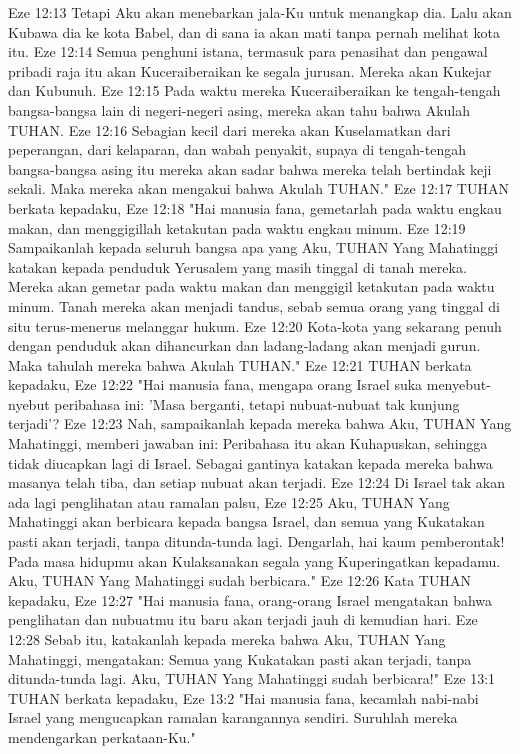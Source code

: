 Eze 12:13  Tetapi Aku akan menebarkan jala-Ku untuk menangkap dia. Lalu akan Kubawa dia ke kota Babel, dan di sana ia akan mati tanpa pernah melihat kota itu.
Eze 12:14  Semua penghuni istana, termasuk para penasihat dan pengawal pribadi raja itu akan Kuceraiberaikan ke segala jurusan. Mereka akan Kukejar dan Kubunuh.
Eze 12:15  Pada waktu mereka Kuceraiberaikan ke tengah-tengah bangsa-bangsa lain di negeri-negeri asing, mereka akan tahu bahwa Akulah TUHAN.
Eze 12:16  Sebagian kecil dari mereka akan Kuselamatkan dari peperangan, dari kelaparan, dan wabah penyakit, supaya di tengah-tengah bangsa-bangsa asing itu mereka akan sadar bahwa mereka telah bertindak keji sekali. Maka mereka akan mengakui bahwa Akulah TUHAN."
Eze 12:17  TUHAN berkata kepadaku,
Eze 12:18  "Hai manusia fana, gemetarlah pada waktu engkau makan, dan menggigillah ketakutan pada waktu engkau minum.
Eze 12:19  Sampaikanlah kepada seluruh bangsa apa yang Aku, TUHAN Yang Mahatinggi katakan kepada penduduk Yerusalem yang masih tinggal di tanah mereka. Mereka akan gemetar pada waktu makan dan menggigil ketakutan pada waktu minum. Tanah mereka akan menjadi tandus, sebab semua orang yang tinggal di situ terus-menerus melanggar hukum.
Eze 12:20  Kota-kota yang sekarang penuh dengan penduduk akan dihancurkan dan ladang-ladang akan menjadi gurun. Maka tahulah mereka bahwa Akulah TUHAN."
Eze 12:21  TUHAN berkata kepadaku,
Eze 12:22  "Hai manusia fana, mengapa orang Israel suka menyebut-nyebut peribahasa ini: 'Masa berganti, tetapi nubuat-nubuat tak kunjung terjadi'?
Eze 12:23  Nah, sampaikanlah kepada mereka bahwa Aku, TUHAN Yang Mahatinggi, memberi jawaban ini: Peribahasa itu akan Kuhapuskan, sehingga tidak diucapkan lagi di Israel. Sebagai gantinya katakan kepada mereka bahwa masanya telah tiba, dan setiap nubuat akan terjadi.
Eze 12:24  Di Israel tak akan ada lagi penglihatan atau ramalan palsu,
Eze 12:25  Aku, TUHAN Yang Mahatinggi akan berbicara kepada bangsa Israel, dan semua yang Kukatakan pasti akan terjadi, tanpa ditunda-tunda lagi. Dengarlah, hai kaum pemberontak! Pada masa hidupmu akan Kulaksanakan segala yang Kuperingatkan kepadamu. Aku, TUHAN Yang Mahatinggi sudah berbicara."
Eze 12:26  Kata TUHAN kepadaku,
Eze 12:27  "Hai manusia fana, orang-orang Israel mengatakan bahwa penglihatan dan nubuatmu itu baru akan terjadi jauh di kemudian hari.
Eze 12:28  Sebab itu, katakanlah kepada mereka bahwa Aku, TUHAN Yang Mahatinggi, mengatakan: Semua yang Kukatakan pasti akan terjadi, tanpa ditunda-tunda lagi. Aku, TUHAN Yang Mahatinggi sudah berbicara!"
Eze 13:1  TUHAN berkata kepadaku,
Eze 13:2  "Hai manusia fana, kecamlah nabi-nabi Israel yang mengucapkan ramalan karangannya sendiri. Suruhlah mereka mendengarkan perkataan-Ku."

